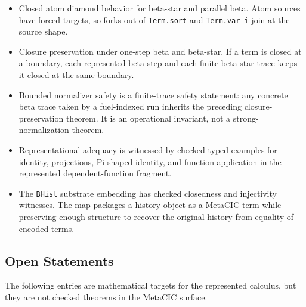 \begin{itemize}
  \item Closed atom diamond behavior for beta-star and parallel beta. Atom
    sources have forced targets, so forks out of \texttt{Term.sort} and
    \texttt{Term.var i} join at the source shape.
  \item Closure preservation under one-step beta and beta-star. If a term is
    closed at a boundary, each represented beta step and each finite beta-star
    trace keeps it closed at the same boundary.
  \item Bounded normalizer safety is a finite-trace safety statement: any
    concrete beta trace taken by a fuel-indexed run inherits the preceding
    closure-preservation theorem. It is an operational invariant, not a
    strong-normalization theorem.
  \item Representational adequacy is witnessed by checked typed examples for
    identity, projections, Pi-shaped identity, and function application in the
    represented dependent-function fragment.
  \item The \texttt{BHist} substrate embedding has checked closedness and
    injectivity witnesses. The map packages a history object as a MetaCIC term
    while preserving enough structure to recover the original history from
    equality of encoded terms.
\end{itemize}

\subsection{Open Statements}
\label{subsec:metatheory-roadmap-open-statements}

The following entries are mathematical targets for the represented calculus,
but they are not checked theorems in the MetaCIC surface.

